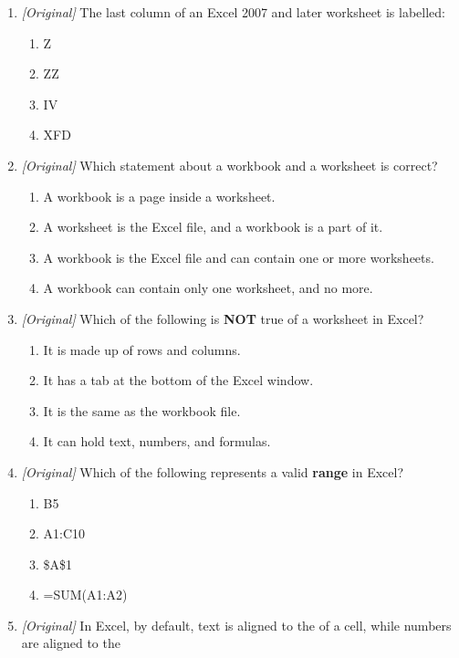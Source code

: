 \begin{enumerate}[label=\textbf{Q\arabic*.}, leftmargin=*]
\begin{enumerate}[label=\Alph*.]
    \item 16,384
    \item 1,048,576
  \end{enumerate}
\item \textit{[Original]} The last column of an Excel 2007 and later
  worksheet is labelled:
  \begin{enumerate}[label=\Alph*.]
    \item Z
    \item ZZ
    \item IV
    \item XFD
  \end{enumerate}
\item \textit{[Original]} Which statement about a workbook and a worksheet is
  correct?
  \begin{enumerate}[label=\Alph*.]
    \item A workbook is a page inside a worksheet.
    \item A worksheet is the Excel file, and a workbook is a part of it.
    \item A workbook is the Excel file and can contain one or more
      worksheets.
    \item A workbook can contain only one worksheet, and no more.
  \end{enumerate}
\item \textit{[Original]} Which of the following is \textbf{NOT} true of a
  worksheet in Excel?
  \begin{enumerate}[label=\Alph*.]
    \item It is made up of rows and columns.
    \item It has a tab at the bottom of the Excel window.
    \item It is the same as the workbook file.
    \item It can hold text, numbers, and formulas.
  \end{enumerate}
\item \textit{[Original]} Which of the following represents a valid
  \textbf{range} in Excel?
  \begin{enumerate}[label=\Alph*.]
    \item B5
    \item A1:C10
    \item \$A\$1
    \item =SUM(A1:A2)
  \end{enumerate}
\item \textit{[Original]} In Excel, by default, text is aligned to the
  \underline{\hspace{1.6cm}} of a cell, while numbers are aligned to the

\end{enumerate}
